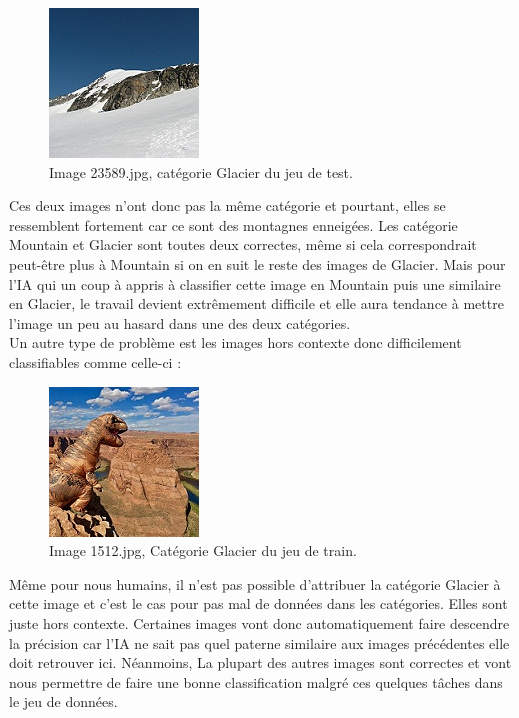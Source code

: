 \documentclass[12pt ,a4paper ]{article}
\begin{document}
\begin{multicols}{2}
\begin{figure}[H]
\begin{center}
\includegraphics[scale=1]{./img/23589.jpg}
\caption{\small{Image 23589.jpg, catégorie Glacier du jeu de test.}}
\end{center}
\end{figure}
Ces deux images n’ont donc pas la même catégorie et pourtant, elles se ressemblent fortement car ce sont des montagnes enneigées. Les catégorie Mountain et Glacier sont toutes deux correctes, même si cela correspondrait peut-être plus à Mountain si on en suit le reste des images de Glacier. Mais pour l'IA qui un coup à appris à classifier cette image en Mountain puis une similaire en Glacier, le travail devient extrêmement difficile et elle aura tendance à mettre l'image un peu au hasard dans une des deux catégories.\\

Un autre type de problème est les images hors contexte donc difficilement classifiables comme celle-ci :
 
\begin{figure}[H]
\begin{center}
\includegraphics[scale=1]{./img/1512.jpg}
\caption{\small{Image 1512.jpg, Catégorie Glacier du jeu de train.}}
\end{center}
\end{figure}
Même pour nous humains, il n'est pas possible d'attribuer la catégorie Glacier à cette image et c'est le cas pour pas mal de données dans les catégories. Elles sont juste hors contexte. 
Certaines images vont donc automatiquement faire descendre la précision car l'IA ne sait pas quel paterne similaire aux images précédentes elle doit retrouver ici. Néanmoins, La plupart des autres images sont correctes et vont nous permettre de faire une bonne classification malgré ces quelques tâches dans le jeu de données.


\end{multicols}
\end{document}
